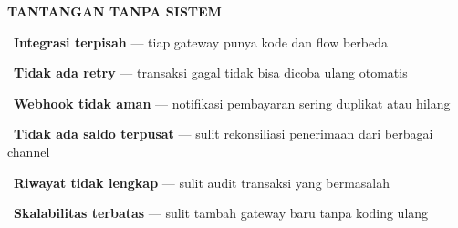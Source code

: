 \documentclass[a4paper]{article}
\begin{document}
\noindent
\begin{minipage}[t]{0.485\textwidth}
    \colorbox{RedLight}{%
        \begin{minipage}{\dimexpr\textwidth-14pt}
            \vspace{5pt}
            {\fontsize{10}{13}\selectfont\bfseries\color{RedText} TANTANGAN TANPA SISTEM}
            \vspace{5pt}
        \end{minipage}}
    \vspace{6pt}

    {\fontsize{9.5}{13}\selectfont\color{TextDark}%
    \textbullet\ \textbf{Integrasi terpisah} --- tiap gateway punya kode dan flow berbeda\par\vspace{4pt}%
    \textbullet\ \textbf{Tidak ada retry} --- transaksi gagal tidak bisa dicoba ulang otomatis\par\vspace{4pt}%
    \textbullet\ \textbf{Webhook tidak aman} --- notifikasi pembayaran sering duplikat atau hilang\par\vspace{4pt}%
    \textbullet\ \textbf{Tidak ada saldo terpusat} --- sulit rekonsiliasi penerimaan dari berbagai channel\par\vspace{4pt}%
    \textbullet\ \textbf{Riwayat tidak lengkap} --- sulit audit transaksi yang bermasalah\par\vspace{4pt}%
    \textbullet\ \textbf{Skalabilitas terbatas} --- sulit tambah gateway baru tanpa koding ulang}%
\end{minipage}%
\hfill%
\end{document}
